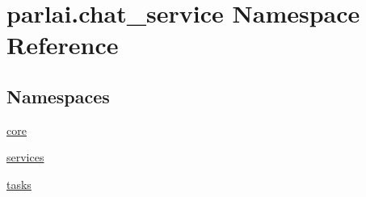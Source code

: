 \hypertarget{namespaceparlai_1_1chat__service}{}\section{parlai.\+chat\+\_\+service Namespace Reference}
\label{namespaceparlai_1_1chat__service}
\subsection*{Namespaces}
\begin{DoxyCompactItemize}
\item 
 \hyperlink{namespaceparlai_1_1chat__service_1_1core}{core}
\item 
 \hyperlink{namespaceparlai_1_1chat__service_1_1services}{services}
\item 
 \hyperlink{namespaceparlai_1_1chat__service_1_1tasks}{tasks}
\end{DoxyCompactItemize}
